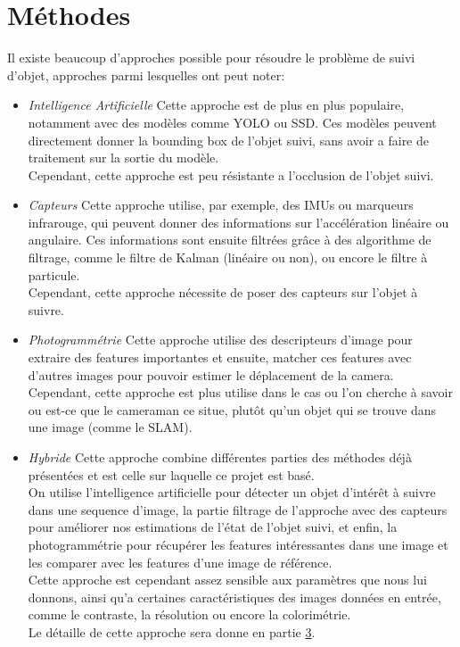 \section{Méthodes}
Il existe beaucoup d'approches possible pour résoudre le problème de suivi d'objet, approches parmi lesquelles ont peut noter:
\begin{itemize}
	\item \textit{Intelligence Artificielle}\newline
	Cette approche est de plus en plus populaire, notamment avec des modèles comme YOLO\cite{redmon_you_2016} ou SSD\cite{liu_ssd_2016}. Ces modèles peuvent directement donner la bounding box de l'objet suivi, sans avoir a faire de traitement sur la sortie du modèle.\\
	Cependant, cette approche est peu résistante a l'occlusion de l'objet suivi.\\
	
	\item \textit{Capteurs}\newline
	Cette approche utilise, par exemple, des IMUs ou marqueurs infrarouge, qui peuvent donner des informations sur l'accélération linéaire ou angulaire. Ces informations sont ensuite filtrées grâce à des algorithme de filtrage, comme le filtre de Kalman (linéaire ou non), ou encore le filtre à particule.\\
	Cependant, cette approche nécessite de poser des capteurs sur l'objet à suivre.\\
	
	\item \textit{Photogrammétrie}\newline
	Cette approche utilise des descripteurs d'image pour extraire des features importantes et ensuite, matcher ces features avec d'autres images pour pouvoir estimer le déplacement de la camera.\\
	Cependant, cette approche est plus utilise dans le cas ou l'on cherche à savoir ou est-ce que le cameraman ce situe, plutôt qu'un objet qui se trouve dans une image (comme le SLAM).\\
	
	\item \textit{Hybride}\newline
	Cette approche combine différentes parties des méthodes déjà présentées et est celle sur laquelle ce projet est basé.\\
	On utilise l'intelligence artificielle pour détecter un objet d'intérêt à suivre dans une sequence d'image, la partie filtrage de l'approche avec des capteurs pour améliorer nos estimations de l'état de l'objet suivi, et enfin, la photogrammétrie pour récupérer les features intéressantes dans une image et les comparer avec les features d'une image de référence.\\
	Cette approche est cependant assez sensible aux paramètres que nous lui donnons, ainsi qu'a certaines caractéristiques des images données en entrée, comme le contraste, la résolution ou encore la colorimétrie.\\
	Le détaille de cette approche sera donne en partie \hyperlink{chapter.3}{3}.\\
\end{itemize}
